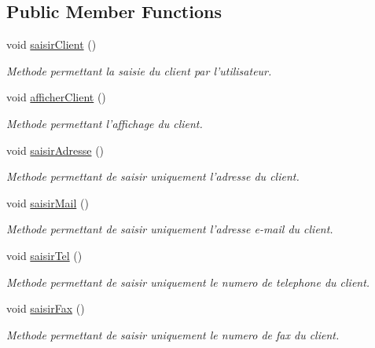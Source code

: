 \subsection*{Public Member Functions}
\begin{DoxyCompactItemize}
\item 
void \hyperlink{classgestion_commande_1_1_client_a4321a476e46367fb05288dd404681d18}{saisir\-Client} ()
\begin{DoxyCompactList}\small\item\em Methode permettant la saisie du client par l'utilisateur. \end{DoxyCompactList}\item 
void \hyperlink{classgestion_commande_1_1_client_a53a0a0f32d6749b1e024d25358df95c2}{afficher\-Client} ()
\begin{DoxyCompactList}\small\item\em Methode permettant l'affichage du client. \end{DoxyCompactList}\item 
void \hyperlink{classgestion_commande_1_1_client_aae19e5e1047008ebc311a60f8bba12ef}{saisir\-Adresse} ()
\begin{DoxyCompactList}\small\item\em Methode permettant de saisir uniquement l'adresse du client. \end{DoxyCompactList}\item 
void \hyperlink{classgestion_commande_1_1_client_a43705de1f5aabccba0b82e608eb7be36}{saisir\-Mail} ()
\begin{DoxyCompactList}\small\item\em Methode permettant de saisir uniquement l'adresse e-\/mail du client. \end{DoxyCompactList}\item 
void \hyperlink{classgestion_commande_1_1_client_ad05b1382806adbf2dbbe3ba3ae87873c}{saisir\-Tel} ()
\begin{DoxyCompactList}\small\item\em Methode permettant de saisir uniquement le numero de telephone du client. \end{DoxyCompactList}\item 
void \hyperlink{classgestion_commande_1_1_client_a69d2d1c75ffe66dd5eec68eecacbe2ec}{saisir\-Fax} ()
\begin{DoxyCompactList}\small\item\em Methode permettant de saisir uniquement le numero de fax du client. \end{DoxyCompactList}\item 

\end{DoxyCompactItemize}
